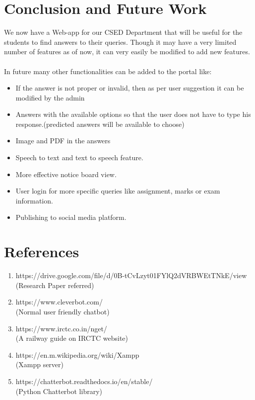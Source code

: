 \documentclass{mnnit}
\begin{document}
\user
\chapter{Conclusion and Future Work}
We now have a Web-app for our CSED Department that will be useful for the students to find answers to their queries. Though it may have a very limited number of features as of now, it can very easily be modified to add new features.\\\\
In future many other functionalities can be added to the portal like: 
\begin{itemize}
    \item If the answer is not proper or invalid, then as per user suggestion it can be modified by the admin
    \item Answers with the available options so that the user does not have to type his response.(predicted answers will be available to choose)
    \item Image and PDF in the answers
    \item Speech to text and text to speech feature.
    \item More effective notice board view.
    \item User login for more specific queries like assignment, marks or exam information.
    \item Publishing to social media platform.
\end{itemize}


\chapter{References}
\begin{enumerate}
	\item https://drive.google.com/file/d/0B-tCvLzyt01FYlQ2dVRBWEtTNkE/view
	\\(Research Paper referred)

	\item https://www.cleverbot.com/  \\(Normal user friendly chatbot)


	\item https://www.irctc.co.in/nget/  \\(A railway guide on IRCTC website)

	\item https://en.m.wikipedia.org/wiki/Xampp \\(Xampp server)

	\item https://chatterbot.readthedocs.io/en/stable/  \\(Python Chatterbot library)
\end{enumerate}




\end{document}
